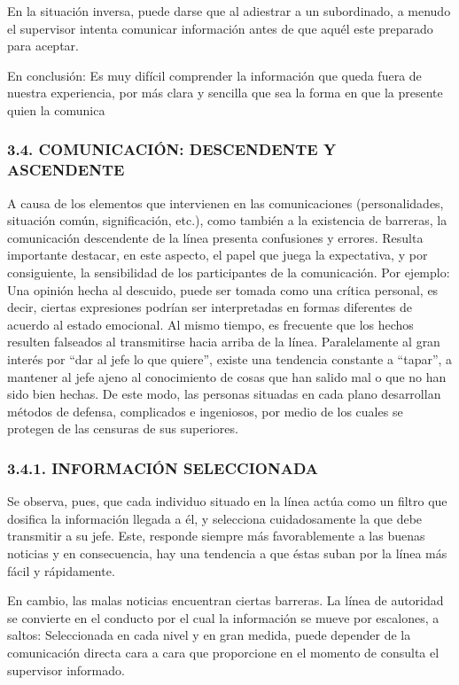 En la situación inversa, puede darse que al adiestrar a un subordinado, a menudo el supervisor intenta comunicar información antes de que aquél este preparado para aceptar.



En conclusión: Es muy difícil comprender la información que queda fuera de nuestra experiencia, por más clara y sencilla que sea la forma en que la presente quien la comunica

\subsubsection*{3.4. COMUNICACIÓN: DESCENDENTE Y ASCENDENTE}
A causa de los elementos que intervienen en las comunicaciones (personalidades, situación común, significación, etc.), como también a la existencia de barreras, la comunicación descendente de la línea presenta confusiones y errores. Resulta importante destacar, en este aspecto, el papel que juega la expectativa, y por consiguiente, la sensibilidad de los participantes de la comunicación. Por ejemplo: Una opinión hecha al descuido, puede ser tomada como una crítica personal, es decir, ciertas expresiones podrían ser interpretadas en formas diferentes de acuerdo al estado emocional. Al mismo tiempo, es frecuente que los hechos resulten falseados al transmitirse hacia arriba de la línea. Paralelamente al gran interés por “dar al jefe lo que quiere”, existe una tendencia constante a “tapar”, a mantener al jefe ajeno al conocimiento de cosas que han salido mal o que no han sido bien hechas. De este modo, las personas situadas en cada plano desarrollan métodos de defensa, complicados e ingeniosos, por medio de los cuales se protegen de las censuras de sus superiores.

\subsubsection*{3.4.1. INFORMACIÓN SELECCIONADA}
Se observa, pues, que cada individuo situado en la línea actúa como un filtro que dosifica la información llegada a él, y selecciona cuidadosamente la que debe transmitir a su jefe. Este, responde siempre más favorablemente a las buenas noticias y en consecuencia, hay una tendencia a que éstas suban por la línea más fácil y rápidamente.

En cambio, las malas noticias encuentran ciertas barreras. La línea de autoridad se convierte en el conducto por el cual la información se mueve por escalones, a saltos: Seleccionada en cada nivel y en gran medida, puede depender de la comunicación directa cara a cara que proporcione en el momento de consulta el supervisor informado.


